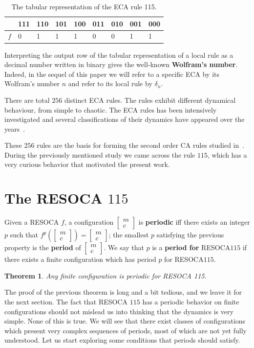 \documentclass[submission,copyright,creativecommons]{eptcs}
\newcommand{\cvres}[2]{\ensuremath{\begin{bmatrix}#1\\#2\end{bmatrix}}\xspace}
\newcommand{\RESOCA}{RESOCA\xspace}
\newtheorem{theorem}{Theorem}
\begin{document}
\begin{table}[]
\centering
\begin{tabular}{lllllllll}
\hline
    & 111 & 110 & 101 & 100 & 011 & 010 & 001 & 000 \\ \hline
$f$ &\phantom{0}0   &\phantom{0}1   &\phantom{0}1   &\phantom{0}1   &\phantom{0}0   &\phantom{0}0   &\phantom{0}1   &\phantom{0}1   \\ \hline
\end{tabular}
\caption{The tabular representation of the ECA rule 115.}
\label{table:rule115}
\end{table}

Interpreting the output row of the tabular 
representation
of a local rule as a decimal number written in binary gives the well-known
\textbf{Wolfram's number}. Indeed, in the sequel of this paper we will refer to
a specific ECA by its Wolfram's number $n$ and refer to its local rule by $\delta_n$. 

There are total $256$ distinct ECA rules. The rules exhibit different dynamical behaviour, from simple to chaotic. 
The ECA rules has been intensively investigated and several classifications of their dynamics have appeared over the years~\cite{Braga1995,kurka1997languages,culik1988undecidability,schule2012full,EnricoTCS}. 

These $256$ rules are the basis for forming the second order CA rules studied in~\cite{formenti2024elementary}.
During the previously mentioned study we came across the rule $115$, which has a very curious behavior that motivated the present work.

%
\section{The RESOCA $115$}
\label{RESOCA115}

Given a RESOCA $f$, a configuration \cvres{m}{c} is \textbf{periodic} iff there exists an integer $p$ such that $f^p\left(\cvres{m}{c}\right)=\cvres{m}{c}$; the smallest $p$ satisfying the previous property is the \textbf{period} of \cvres{m}{c}. We say that $p$ is a \textbf{period for} \RESOCA $115$ if there exists a finite configuration which has period $p$ for \RESOCA $115$.

\begin{theorem}
\label{th:all-finite-cfg-are-periodic}
    Any finite configuration is periodic for RESOCA 115.
\end{theorem}

The proof of the previous theorem is long and a bit tedious, and we leave it for the next section.
The fact that RESOCA $115$ has a periodic behavior on finite configurations should not mislead us into thinking that the dynamics is very simple. None of this is true. We will see that there exist classes of configurations which
present very complex sequences of periods, most of which are not yet fully understood. Let us start exploring some conditions that periods should satisfy.
\end{document}
